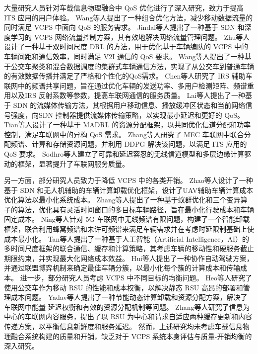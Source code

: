 大量研究人员针对车载信息物理融合中 QoS 优化进行了深入研究，致力于提高 ITS 应用的用户体验。
Wang等人\cite{wang2016offloading}提出了一种组合优化方法，减少移动数据流量的同时满足 VCPS 中面向 QoS 的服务需求。
Jindal等人\cite{jindal2018sedative}提出了一种基于 SDN 和深度学习的 VCPS 网络流量控制方案，其有效地解决网络流量管理问题。
Zhu等人\cite{zhu2022joint}设计了一种基于双时间尺度 DRL 的方法，用于优化基于车辆编队的 VCPS 中的车辆间距和通信效率，同时满足 V2I 通信的 QoS 要求。
Wang等人\cite{wang2023a}提出了一种基于公交车聚类和混合数据调度的集群式车辆通信方法，实现了从公交车到普通车辆的有效数据传播并满足了严格和个性化的QoS需求。
Chen等人\cite{chen2021qos}研究了 IRS 辅助车联网中的频谱共享问题，旨在通过优化车辆的发送功率、多用户检测矩阵、频谱重用以及IRS 反射系数等参数，提高车联网通信的服务质量。
Lai等人\cite{lai2017a}提出了一种基于 SDN 的流媒体传输方法，其根据用户移动信息、播放缓冲区状态和当前网络信号强度，向SDN 控制器提供流媒体传输策略，以实现最小延迟和更好的 QoS。
Tian等人\cite{tian2022multiagent}设计了一种基于 MADRL 的资源分配框架，以共同优化信道分配和功率控制，满足车联网中的异构 QoS 需求。
Zhang等人\cite{zhang2020hierarchical}研究了 MEC 车联网中联合分配频谱、计算和存储资源问题，并利用 DDPG 解决该问题，以满足 ITS 应用的 QoS 要求。
Sodhro等人\cite{sodhro2020ai}建立了可靠和延迟容忍的无线信道模型和多层边缘计算驱动的框架，显著提升了车联网服务质量。

另一方面，部分研究人员致力于降低 VCPS 中的各类开销。
Zhao等人\cite{zhao2021a}设计了一种基于 SDN 和无人机辅助的车辆计算卸载优化框架，设计了UAV辅助车辆计算成本优化算法以最小化系统成本。
Zhang等人\cite{zhang2019hybrid}提出了一种基于蚁群优化和三个变异算子的算法，优化具有灵活时间窗口的多目标车辆路径，旨在最小化行驶成本和车辆固定成本。
Ning等人\cite{ning2020when}针对 5G 车联网中无线频谱有限问题，构建了一个智能卸载框架，联合利用蜂窝频谱和未许可频谱来满足车辆需求并在考虑时延限制基础上使成本最小化。
Tan等人\cite{tan2019twin}提出了一种基于人工智能（Artificial Intelligence，AI）的多时间尺度框架的联合通信、缓存和计算策略，其考虑车辆的移动性和硬服务截止期限约束，并实现最大化网络成本效益。
Hui等人\cite{hui2022collaboration}提出了一种协作自动驾驶方案，并通过联盟博弈机制来确定最佳车辆分簇，以最小化每个簇的计算成本和传输成本。
进一步，部分研究人员考虑 VCPS 中不同目标的均衡问题。
Heo等人\cite{heo2019performance}研究了使用公交车作为移动 RSU 的性能和成本权衡，以解决静态 RSU 高昂的部署和管理成本问题。
Yadav等人\cite{yadav2020energy}提出了一种节能动态计算卸载和资源分配方案，解决了车联网中能量-延迟权衡和有效的资源分配机制等问题。
Zhang等人\cite{zhang2022low}研究了信息为中心的车联网内容服务，提出了以 RSU 为中心和请求自适应两种缓存更新和内容传递方案，以平衡信息新鲜度和服务延迟。
然而，上述研究均未考虑车载信息物理融合系统构建的质量和开销，缺乏对于 VCPS 系统本身评估与质量-开销均衡的深入研究。

